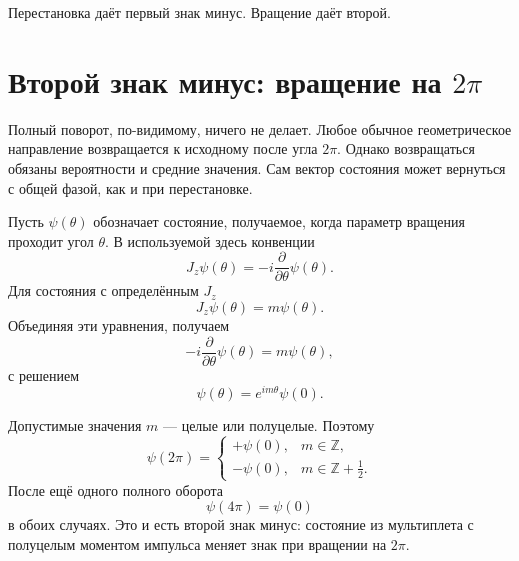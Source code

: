 Перестановка даёт первый знак минус. Вращение даёт второй.

\section{Второй знак минус: вращение на \texorpdfstring{\(2\pi\)}{2 pi}}

Полный поворот, по-видимому, ничего не делает. Любое обычное геометрическое направление возвращается к исходному после угла \(2\pi\). Однако возвращаться обязаны вероятности и средние значения. Сам вектор состояния может вернуться с общей фазой, как и при перестановке.

\begin{classroomqa}
\end{classroomqa}


Пусть \(\psi(\theta)\) обозначает состояние, получаемое, когда параметр вращения проходит угол \(\theta\). В используемой здесь конвенции
\begin{equation}
J_z\psi(\theta)
=
-i\frac{\partial}{\partial\theta}\psi(\theta).
\end{equation}
Для состояния с определённым \(J_z\)
\begin{equation}
J_z\psi(\theta)=m\psi(\theta).
\end{equation}
Объединяя эти уравнения, получаем
\begin{equation}
-i\frac{\partial}{\partial\theta}\psi(\theta)
=
m\psi(\theta),
\end{equation}
с решением
\begin{equation}
\psi(\theta)=e^{im\theta}\psi(0).
\end{equation}

Допустимые значения \(m\) — целые или полуцелые. Поэтому
\begin{equation}
\psi(2\pi)
=
\begin{cases}
+\psi(0), & m\in\mathbb Z,\\[4pt]
-\psi(0), & m\in\mathbb Z+\tfrac12.
\end{cases}
\end{equation}
После ещё одного полного оборота
\begin{equation}
\psi(4\pi)=\psi(0)
\end{equation}
в обоих случаях. Это и есть второй знак минус: состояние из мультиплета с полуцелым моментом импульса меняет знак при вращении на \(2\pi\).

